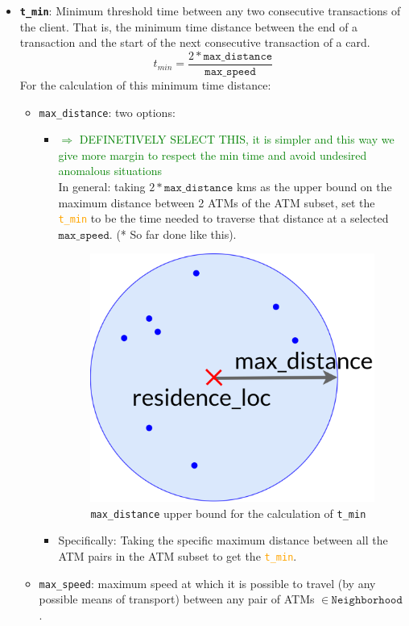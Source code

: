 \documentclass{article}
\begin{document}
\begin{itemize}
    \item \textbf{\texttt{t\_min}}: Minimum threshold time between any two consecutive 
    transactions of the client. That is, the minimum time distance between the end of 
    a transaction and the start of the next consecutive transaction of a card. 
    $$t_{min} = \frac{2 * \texttt{max\_distance}}{\texttt{max\_speed}}$$
    For the calculation of this minimum time distance:
    \begin{itemize}
      \item \texttt{max\_distance}: two options:  
        \begin{itemize}
          \item \textcolor{green}{$\Rightarrow$ DEFINETIVELY SELECT THIS, it is simpler and this way we give more margin to respect the min time and avoid undesired anomalous situations\\}In general: taking $2*\texttt{max\_distance}$ kms as the upper bound on 
          the maximum distance between 2 ATMs of the ATM subset, set the 
          \textcolor{orange}{\texttt{t\_min}} to be the time needed to traverse that distance 
          at a selected $\texttt{max\_speed}$. (* So far done like this). 
          \begin{figure}[H]
            \centering
            \includegraphics[scale=0.5]{images/tx-generation-tmin.png}
            \caption{\texttt{max\_distance} upper bound for the calculation of \texttt{t\_min}}
        \end{figure}    
          \item Specifically: Taking the specific maximum distance between all the ATM pairs 
          in the ATM subset to get the \textcolor{orange}{\texttt{t\_min}}.
      \end{itemize}  
      \item \texttt{max\_speed}: maximum speed at which it is possible to travel 
      (by any possible means of transport) between any pair of ATMs $\in 
      \ \texttt{Neighborhood}$.
    \end{itemize}


\end{itemize}
\end{document}
